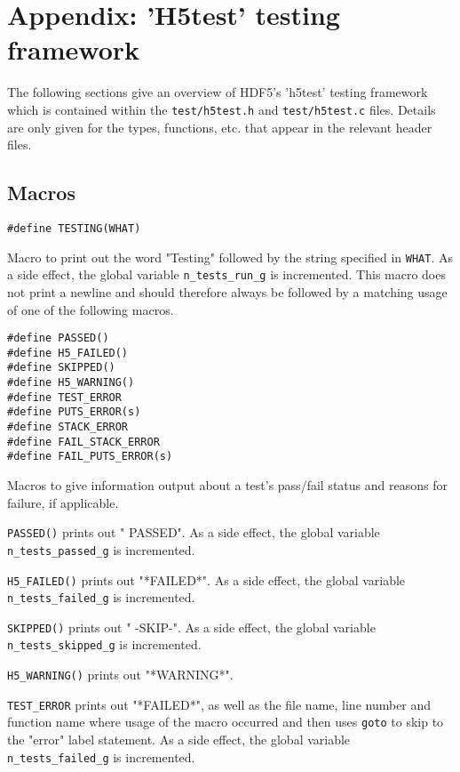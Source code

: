 \documentclass[../HDF5_RFC.tex]{subfiles}
\begin{document}
\newpage

\section{Appendix: 'H5test' testing framework}
\label{apdx:h5test}

The following sections give an overview of HDF5's 'h5test' testing framework which is contained
within the \texttt{test/h5test.h} and \texttt{test/h5test.c} files. Details are only given for the
types, functions, etc. that appear in the relevant header files.

\subsection{Macros}

\begin{verbatim}
#define TESTING(WHAT)
\end{verbatim}

Macro to print out the word "Testing" followed by the string specified in \texttt{WHAT}. As a side
effect, the global variable \texttt{n\_tests\_run\_g} is incremented. This macro does not print a
newline and should therefore always be followed by a matching usage of one of the following macros.

\begin{verbatim}
#define PASSED()
#define H5_FAILED()
#define SKIPPED()
#define H5_WARNING()
#define TEST_ERROR
#define PUTS_ERROR(s)
#define STACK_ERROR
#define FAIL_STACK_ERROR
#define FAIL_PUTS_ERROR(s)
\end{verbatim}

Macros to give information output about a test's pass/fail status and reasons for failure, if
applicable.

\texttt{PASSED()} prints out " PASSED". As a side effect, the global variable
\texttt{n\_tests\_passed\_g} is incremented.

\texttt{H5\_FAILED()} prints out "*FAILED*". As a side effect, the global variable
\texttt{n\_tests\_failed\_g} is incremented.

\texttt{SKIPPED()} prints out " -SKIP-". As a side effect, the global variable
\texttt{n\_tests\_skipped\_g} is incremented.

\texttt{H5\_WARNING()} prints out "*WARNING*".

\texttt{TEST\_ERROR} prints out "*FAILED*", as well as the file name, line number and function name
where usage of the macro occurred and then uses \texttt{goto} to skip to the "error" label statement.
As a side effect, the global variable \texttt{n\_tests\_failed\_g} is incremented.
\end{document}
